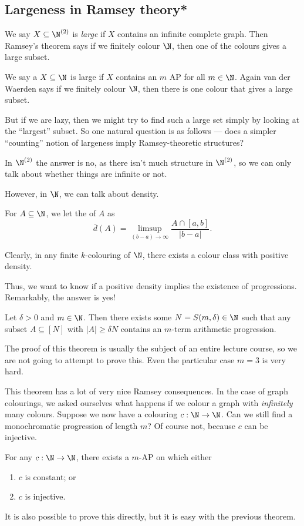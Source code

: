 \documentclass[a4paper]{article}
\begin{document}
\subsection{Largeness in Ramsey theory*}
We say $X \subseteq \N^{(2)}$ is \emph{large} if $X$ contains an infinite complete graph. Then Ramsey's theorem says if we finitely colour $\N$, then one of the colours gives a large subset.

We say a $X \subseteq \N$ is large if $X$ contains an $m$ AP for all $m \in \N$. Again van der Waerden says if we finitely colour $\N$, then there is one colour that gives a large subset.

But if we are lazy, then we might try to find such a large set simply by looking at the ``largest'' subset. So one natural question is as follows --- does a simpler ``counting'' notion of largeness imply Ramsey-theoretic structures?

In $\N^{(2)}$ the answer is no, as there isn't much structure in $\N^{(2)}$, so we can only talk about whether things are infinite or not.

However, in $\N$, we can talk about density.
\begin{defi}[Density]
 For $A \subseteq \N$, we let the  of $A$ as
 \[
   \bar{d}(A) = \limsup_{(b - a) \to \infty} \frac{A \cap [a, b]}{|b - a|}.
 \]
\end{defi}
Clearly, in any finite $k$-colouring of $\N$, there exists a colour class with positive density.

Thus, we want to know if a positive density implies the existence of progressions. Remarkably, the answer is yes!
\begin{thm}
  Let $\delta > 0$ and $m \in \N$. Then there exists some $N = S(m, \delta) \in \N$ such that any subset $A \subseteq [N]$ with $|A| \geq \delta N$ contains an $m$-term arithmetic progression.
\end{thm}
The proof of this theorem is usually the subject of an entire lecture course, so we are not going to attempt to prove this. Even the particular case $m = 3$ is very hard.

This theorem has a lot of very nice Ramsey consequences. In the case of graph colourings, we asked ourselves what happens if we colour a graph with \emph{infinitely} many colours. Suppose we now have a colouring $c: \N \to \N$. Can we still find a monochromatic progression of length $m$? Of course not, because $c$ can be injective.

\begin{thm}
  For any $c: \N \to \N$, there exists a $m$-AP on which either
  \begin{enumerate}
    \item $c$ is constant; or
    \item $c$ is injective.
  \end{enumerate}
\end{thm}
It is also possible to prove this directly, but it is easy with the previous theorem.
\end{document}
